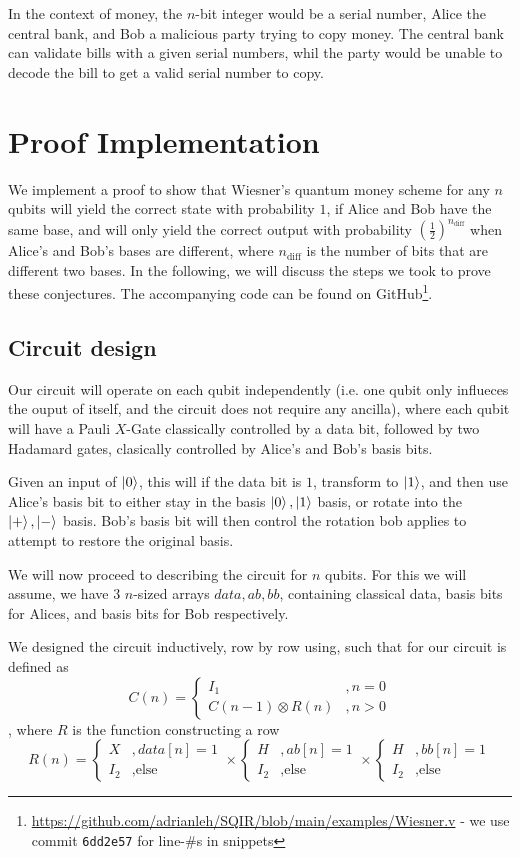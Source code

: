 \documentclass{article}
\begin{document}
In the context of money, the $n$-bit integer would be a serial number, Alice the central bank, and Bob a malicious  party trying to copy money.
The central bank can validate bills with a given serial numbers, whil the  party would be unable to decode the bill to get a valid serial number to copy.

\section{Proof Implementation}\label{sec:proof-impl}
We implement a proof to show that Wiesner's quantum money scheme for any $n$ qubits will yield the correct state with probability $1$, if Alice and Bob have the same base, and will only yield the correct output with probability $(\frac{1}{2})^{n_{\text{diff}}}$ when Alice's and Bob's bases are different, where $n_{\text{diff}}$ is the number of bits that are different two bases. In the following, we will discuss the steps we took to prove these conjectures. The accompanying code can be found on GitHub\footnote{\url{https://github.com/adrianleh/SQIR/blob/main/examples/Wiesner.v} - we use commit \texttt{6dd2e57} for line-\#s in snippets}.

\subsection{Circuit design}

Our circuit will operate on each qubit independently (i.e. one qubit only influeces the ouput of itself, and the circuit does not require any ancilla), where each qubit will have a Pauli $X$-Gate classically controlled by a data bit, followed by two Hadamard gates, clasically controlled by Alice's and Bob's basis bits.

Given an input of $\ket{0}$, this will if the data bit is $1$, transform to $\ket{1}$, and then use Alice's basis bit to either stay in the basis $\ket{0},\ket{1}$ basis, or rotate into the $\ket{+},\ket{-}$ basis. 
Bob's basis bit will then control the rotation bob applies to attempt to restore the original basis.

We will now proceed to describing the circuit for $n$ qubits. 
For this we will assume, we have $3$ $n$-sized arrays $data, ab, bb$, containing classical data, basis bits for Alices, and basis bits for Bob respectively.

We designed the circuit inductively, row by row using, such that for our circuit is defined as
$$C(n) = \begin{cases}
I_1&, n=0\\
C(n-1) \otimes R(n)&, n>0
\end{cases}$$,
where $R$ is the function constructing a row
$$R(n) = \begin{cases}X&, data[n] = 1\\ I_2&, \text{else}\end{cases} \times \begin{cases}H&, ab[n] = 1\\ I_2&, \text{else}\end{cases} \times \begin{cases}H&, bb[n] = 1\\ I_2&, \text{else}\end{cases}$$
\end{document}
